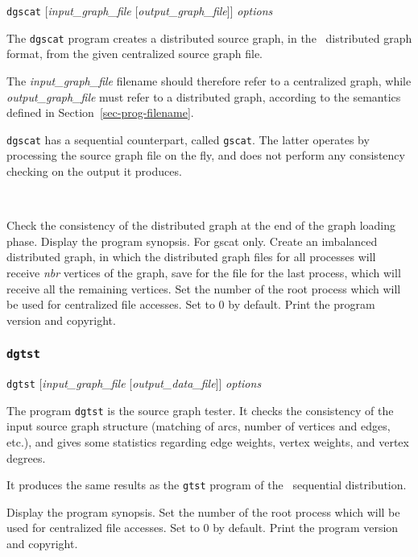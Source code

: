 \begin{itemize}
\progsyn
{\tt dgscat} [{\it input\_graph\_file} [{\it output\_graph\_file}]] {\it options}

\progdes

The {\tt dgscat} program creates a distributed source graph, in the
\scotch\ distributed graph format, from the given centralized source
graph file.

The {\it input\_graph\_file} filename should therefore refer to a
centralized graph, while {\it output\_graph\_file} must refer to a
distributed graph, according to the semantics defined in
Section~\ref{sec-prog-filename}.

{\tt dgscat} has a sequential counterpart, called {\tt gscat}. The
latter operates by processing the source graph file on the fly, and
does not perform any consistency checking on the output it produces.

\progopt\\[-1em]
\begin{itemize}
\iteme[{\tt -c}]
Check the consistency of the distributed graph at the end of the
graph loading phase.
\iteme[{\tt -h}]
Display the program synopsis.
\iteme[{\tt -i}{\it nbr}]
For gscat only. Create an imbalanced distributed graph, in which the
distributed graph files for all processes will receive \textit{nbr}
vertices of the graph, save for the file for the last process, which
will receive all the remaining vertices.
\iteme[{\tt -r}{\it num}]
Set the number of the root process which will be used for centralized
file accesses. Set to $0$ by default.
\iteme[{\tt -V}]
Print the program version and copyright.
\end{itemize}
\end{itemize}

\subsubsection{{\tt dgtst}}

\begin{itemize}
\progsyn
{\tt dgtst} [{\it input\_graph\_file} [{\it output\_data\_file}]] {\it options}

\progdes

The program {\tt dgtst} is the source graph tester. It checks the
consistency of the input source graph structure (matching of arcs,
number of vertices and edges, etc\@.), and gives some statistics
regarding edge weights, vertex weights, and vertex degrees.

It produces the same results as the {\tt gtst} program of the
\scotch\ sequential distribution.

\progopt
\begin{itemize}
\iteme[{\tt -h}]
Display the program synopsis.
\iteme[{\tt -r}{\it num}]
Set the number of the root process which will be used for centralized
file accesses. Set to $0$ by default.
\iteme[{\tt -V}]
Print the program version and copyright.
\end{itemize}
\end{itemize}
